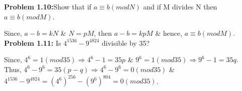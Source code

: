\documentclass[11pt]{article}
\begin{document}
	\textbf{Problem 1.10:}Show that if $a \equiv b (mod N)$ and if M divides N then $a \equiv b (mod M)$.
	
	Since, $a - b = kN$ \& $N = pM$, then $a - b = kpM$ \& hence, $a \equiv b (mod M)$.\\
	
	\textbf{Problem 1.11:} Is $4^{1536} - 9^{4824}$ divisible by 35?
	
	Since, $4^6 = 1 (mod 35) \Rightarrow 4^6 - 1 = 35p$ \& $9^6 = 1 (mod 35) \Rightarrow 9^6 - 1 = 35q$. Thus, $4^6 - 9^6 = 35(p-q) \Rightarrow 4^6 - 9^6 = 0(mod 35)$ \& $4^{1536} - 9^{4824} = (4^6)^{256} - (9^6)^{804} = 0(mod 35)$.
	
\end{document}
